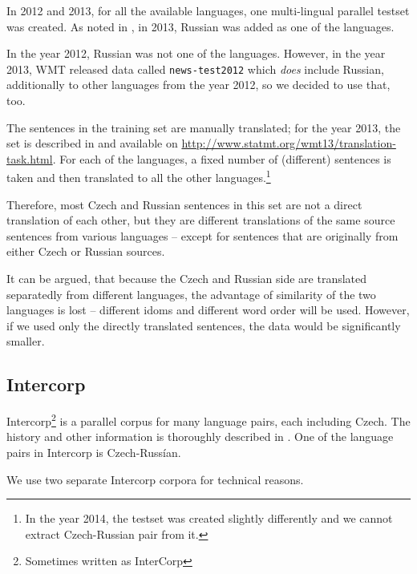 In 2012 and 2013, for all the available languages, one multi-lingual parallel testset was created.
As noted in \cite{wmt_findings_2013}, in 2013, Russian was added as one of the languages. 

In the year 2012, Russian was not one of the languages. However, in the year 2013, WMT released data called \texttt{news-test2012} which \emph{does} include Russian, additionally to other languages from the year 2012, so we decided to use that, too.

The sentences in the training set are manually translated; for the year 2013, the set is described in \cite{wmt_findings_2013} and available on \url{http://www.statmt.org/wmt13/translation-task.html}. For each of the languages, a fixed number of (different) sentences is taken and then translated to all the other languages.\footnote{In the year 2014, the testset was created slightly differently and we cannot extract Czech-Russian pair from it.}


Therefore, most Czech and Russian sentences in this set are not a direct translation of each other, but they are different translations of the same source sentences from various languages -- except for sentences that are originally from either Czech or Russian sources. 

It can be argued, that because the Czech and Russian side are translated separatedly from different languages, the advantage of similarity of the two languages is lost -- different idoms and different word order will be used.
However, if we used only the directly translated sentences, the data would be significantly smaller. 




\subsection{Intercorp}
\label{intercorp_p1}
Intercorp\footnote{Sometimes written as InterCorp} is a parallel corpus for many language pairs, each including Czech. The history and other information is thoroughly described in \cite{intercorp}. One of the language pairs in Intercorp is Czech-Russían.

We use two separate Intercorp corpora for technical reasons. 


